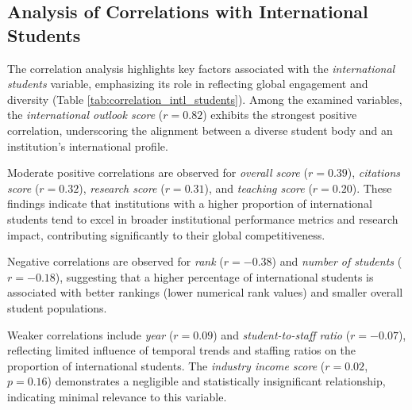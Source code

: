 \documentclass[sigconf]{acmart}
\begin{document}
\subsection{Analysis of Correlations with International Students}

The correlation analysis highlights key factors associated with the \textit{international students} variable, emphasizing its role in reflecting global engagement and diversity (Table \ref{tab:correlation_intl_students}). Among the examined variables, the \textit{international outlook score} ($r = 0.82$) exhibits the strongest positive correlation, underscoring the alignment between a diverse student body and an institution's international profile.

Moderate positive correlations are observed for \textit{overall score} ($r = 0.39$), \textit{citations score} ($r = 0.32$), \textit{research score} ($r = 0.31$), and \textit{teaching score} ($r = 0.20$). These findings indicate that institutions with a higher proportion of international students tend to excel in broader institutional performance metrics and research impact, contributing significantly to their global competitiveness.

Negative correlations are observed for \textit{rank} ($r = -0.38$) and \textit{number of students} ($r = -0.18$), suggesting that a higher percentage of international students is associated with better rankings (lower numerical rank values) and smaller overall student populations. 

Weaker correlations include \textit{year} ($r = 0.09$) and \textit{student-to-staff ratio} ($r = -0.07$), reflecting limited influence of temporal trends and staffing ratios on the proportion of international students. The \textit{industry income score} ($r = 0.02$, $p = 0.16$) demonstrates a negligible and statistically insignificant relationship, indicating minimal relevance to this variable.
\end{document}
